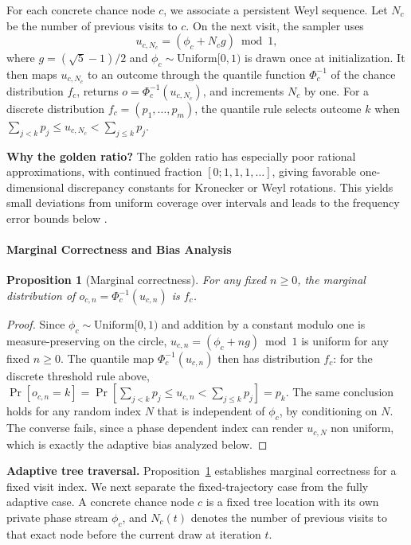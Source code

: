 \documentclass[11pt]{article}
\newtheorem{proposition}{Proposition}
\begin{document}
For each concrete chance node $c$, we associate a persistent Weyl sequence. Let $N_c$ be the number of previous visits to $c$. On the next visit, the sampler uses
\[
u_{c,N_c}=(\phi_c+N_c g)\bmod 1,
\]
where $g=(\sqrt{5}-1)/2$ and $\phi_c\sim\mathrm{Uniform}[0,1)$ is drawn once at initialization. It then maps $u_{c,N_c}$ to an outcome through the quantile function $\Phi_c^{-1}$ of the chance distribution $f_c$, returns $o=\Phi_c^{-1}(u_{c,N_c})$, and increments $N_c$ by one. For a discrete distribution $f_c=(p_1,\ldots,p_m)$, the quantile rule selects outcome $k$ when $\sum_{j<k}p_j\le u_{c,N_c}<\sum_{j\le k}p_j$.

\textbf{Why the golden ratio?} The golden ratio has especially poor rational approximations, with continued fraction $[0;1,1,1,\ldots]$, giving favorable one-dimensional discrepancy constants for Kronecker or Weyl rotations. This yields small deviations from uniform coverage over intervals and leads to the frequency error bounds below \citep{niederreiter1992random}.

\paragraph{Marginal Correctness and Bias Analysis}

\begin{proposition}[Marginal correctness]
\label{prop:unbiased}
For any fixed $n\ge 0$, the marginal distribution of $o_{c,n}=\Phi_c^{-1}(u_{c,n})$ is $f_c$.
\end{proposition}

\begin{proof}
Since $\phi_c \sim \mathrm{Uniform}[0,1)$ and addition by a constant modulo one is measure-preserving on the circle, $u_{c,n}=(\phi_c+ng)\bmod 1$ is uniform for any fixed $n\ge0$. The quantile map $\Phi_c^{-1}(u_{c,n})$ then has distribution $f_c$: for the discrete threshold rule above, $\Pr[o_{c,n}=k]=\Pr[\sum_{j<k}p_j\le u_{c,n}<\sum_{j\le k}p_j]=p_k$. The same conclusion holds for any random index $N$ that is independent of $\phi_c$, by conditioning on $N$. The converse fails, since a phase dependent index can render $u_{c,N}$ non uniform, which is exactly the adaptive bias analyzed below.
\end{proof}

\textbf{Adaptive tree traversal.} Proposition~\ref{prop:unbiased} establishes marginal correctness for a fixed visit index. We next separate the fixed-trajectory case from the fully adaptive case. A concrete chance node $c$ is a fixed tree location with its own private phase stream $\phi_c$, and $N_c(t)$ denotes the number of previous visits to that exact node before the current draw at iteration $t$.
\end{document}
